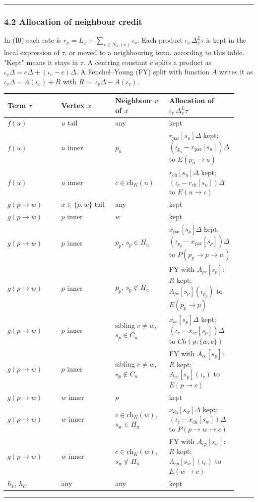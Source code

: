 \documentclass[11pt]{article}
\theoremstyle{remark}
\numberwithin{equation}{section}
\newenvironment{transcription}{\par\medskip\noindent\rule{\linewidth}{0.4pt}\par\nopagebreak}{\par\nopagebreak\noindent\rule{\linewidth}{0.4pt}\par\medskip}
\begin{document}
\begin{transcription}
\subsubsection*{4.2 Allocation of neighbour credit}
In (I0) each rate is $r_x = L_x + \sum_{v \in N_K(x)} \iota_v$. Each product $\iota_v\,\Delta^L_x\tau$ is kept in the local expression of $\tau$, or moved to a neighbouring term, according to this table. "Kept" means it stays in $\tau$. A centring constant $c$ splits a product as $\iota_v\Delta = c\Delta + (\iota_v - c)\Delta$. A Fenchel--Young (FY) split with function $A$ writes it as $\iota_v\Delta = A(\iota_v) + R$ with $R := \iota_v\Delta - A(\iota_v)$.

\begin{center}\footnotesize\begin{tabular}{@{}>{\raggedright\arraybackslash}p{0.230\linewidth}>{\raggedright\arraybackslash}p{0.230\linewidth}>{\raggedright\arraybackslash}p{0.230\linewidth}>{\raggedright\arraybackslash}p{0.230\linewidth}@{}}\toprule
Term $\tau$ & Vertex $x$ & Neighbour $v$ of $x$ & Allocation of $\iota_v\,\Delta^L_x\tau$ \\\midrule
$f(u)$ & $u$ tail & any & kept \\
$f(u)$ & $u$ inner & $p_u$ & $r_{\mathrm{par}}[s_u]\Delta$ kept; $(\iota_{p_u} - r_{\mathrm{par}}[s_u])\Delta$ to $E(p_u \to u)$ \\
$f(u)$ & $u$ inner & $c \in \mathrm{ch}_K(u)$ & $r_{\mathrm{ch}}[s_u]\Delta$ kept; $(\iota_c - r_{\mathrm{ch}}[s_u])\Delta$ to $E(u \to c)$ \\
$g(p \to w)$ & $x \in \{p, w\}$ tail & any & kept \\
$g(p \to w)$ & $p$ inner & $w$ & kept \\
$g(p \to w)$ & $p$ inner & $p_p$, $s_p \in H_u$ & $x_{\mathrm{par}}[s_p]\Delta$ kept; $(\iota_{p_p} - x_{\mathrm{par}}[s_p])\Delta$ to $P(p_p \to p \to w)$ \\
$g(p \to w)$ & $p$ inner & $p_p$, $s_p \notin H_u$ & FY with $A_{pc}[s_p]$: $R$ kept; $A_{pc}[s_p](\iota_{p_p})$ to $E(p_p \to p)$ \\
$g(p \to w)$ & $p$ inner & sibling $c \ne w$, $s_p \in C_u$ & $x_{cc}[s_p]\Delta$ kept; $(\iota_c - x_{cc}[s_p])\Delta$ to $Ch(p; \{w, c\})$ \\
$g(p \to w)$ & $p$ inner & sibling $c \ne w$, $s_p \notin C_u$ & FY with $A_{cc}[s_p]$: $R$ kept; $A_{cc}[s_p](\iota_c)$ to $E(p \to c)$ \\
$g(p \to w)$ & $w$ inner & $p$ & kept \\
$g(p \to w)$ & $w$ inner & $c \in \mathrm{ch}_K(w)$, $s_w \in H_u$ & $x_{\mathrm{ch}}[s_w]\Delta$ kept; $(\iota_c - x_{\mathrm{ch}}[s_w])\Delta$ to $P(p \to w \to c)$ \\
$g(p \to w)$ & $w$ inner & $c \in \mathrm{ch}_K(w)$, $s_w \notin H_u$ & FY with $A_{cp}[s_w]$: $R$ kept; $A_{cp}[s_w](\iota_c)$ to $E(w \to c)$ \\
$h_V$, $h_C$ & any & any & kept \\
\bottomrule\end{tabular}\end{center}


\end{transcription}
\end{document}
